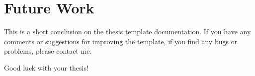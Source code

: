 \chapter{Future Work}
This is a short conclusion on the thesis template documentation. If you have any comments or suggestions for improving the template, if you find any bugs or problems, please contact me. 

\vspace{2cm}

Good luck with your thesis!
